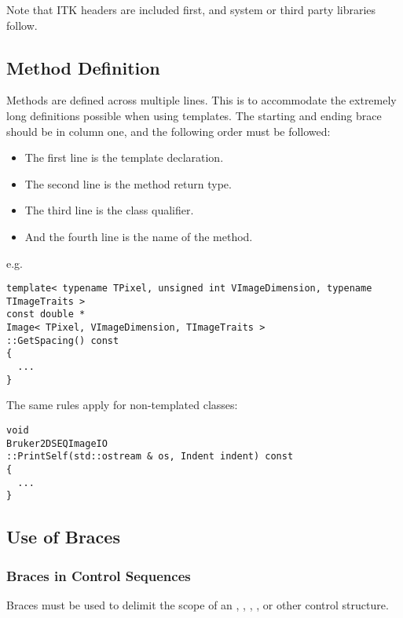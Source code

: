 Note that ITK headers are included first, and system or third party libraries
follow.


\subsection{Method Definition}
\label{subsec:MethodDefinition}

Methods are defined across multiple lines. This is to accommodate the extremely
long definitions possible when using templates. The starting and ending brace
should be in column one, and the following order must be followed:
\begin{itemize}
\item The first line is the template declaration.
\item The second line is the method return type.
\item The third line is the class qualifier.
\item And the fourth line is the name of the method.
\end{itemize}

e.g.

\small
\begin{verbatim}
template< typename TPixel, unsigned int VImageDimension, typename TImageTraits >
const double *
Image< TPixel, VImageDimension, TImageTraits >
::GetSpacing() const
{
  ...
}
\end{verbatim}
\normalsize

The same rules apply for non-templated classes:

\small
\begin{verbatim}
void
Bruker2DSEQImageIO
::PrintSelf(std::ostream & os, Indent indent) const
{
  ...
}
\end{verbatim}
\normalsize


\subsection{Use of Braces}
\label{subsec:UseOfBraces}


\subsubsection{Braces in Control Sequences}
\label{subsubsec:BracesInControlSequences}

Braces must be used to delimit the scope of an , ,
, , or other control structure.

